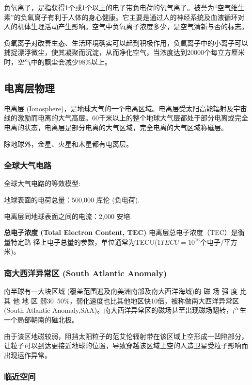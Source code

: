 \documentclass[12pt,a4paper]{article}
\begin{document}
	负氧离子，是指获得1个或1个以上的电子带负电荷的氧气离子。被誉为“空气维生素”的负氧离子有利于人体的身心健康。它主要是通过人的神经系统及血液循环对人的机体生理活动产生影响。空气中负氧离子浓度多少，是空气清新与否的标志。
	
	负氧离子对改善生态、生活环境确实可以起到积极作用，负氧离子中的小离子可以捕捉漂浮微尘，使其凝聚而沉淀，从而净化空气，当浓度达到20000个每立方厘米时，空气中的飘尘会减少98\%以上。
	
	\subsection{电离层物理}
	
	电离层 (Ionosphere)，是地球大气的一个电离区域。电离层受太阳高能辐射及宇宙线的激励而电离的大气高层。60千米以上的整个地球大气层都处于部分电离或完全电离的状态，电离层是部分电离的大气区域，完全电离的大气区域称磁层。
	
	除地球外，金星、火星和木星都有电离层。
	
	\subsubsection{全球大气电路}
	
	全球大气电路的等效模型:
	
	地球表面的电荷总量：500,000 库伦 (负电荷).
	
	电离层同地球表面之间的电流：2,000 安培.
	
	\textbf{总电子浓度 (Total Electron Content, TEC)} 电离层总电子浓度（TEC）是衡量特定路
	径上电子总量的参数，单位通常为TECU($1 TECU=10^{16}$个电子/平方米)。
	
	\subsubsection{南大西洋异常区 (South Atlantic Anomaly)}
	南半球有一大块区域 (覆盖范围遍及南美洲南部及南大西洋海域)的 磁 场 强 度 比 其 他 地 区 弱30~50\%，弱化速度也比其他地区快10倍，被称做南大西洋异常区 (South Atlantic Anomaly,SAA)。南大西洋异常区的磁场甚至出现磁场翻转，产生一个局部朝南的磁北极。
	
	由于该区地磁较弱，阻挡太阳粒子的范艾伦辐射带在该区域上空形成一凹陷部分，让粒子可以到达更接近地球的位置，导致穿越该区域上空的人造卫星受粒子影响而出现运作异常。
	
	\subsubsection{临近空间}
	
\end{document}
